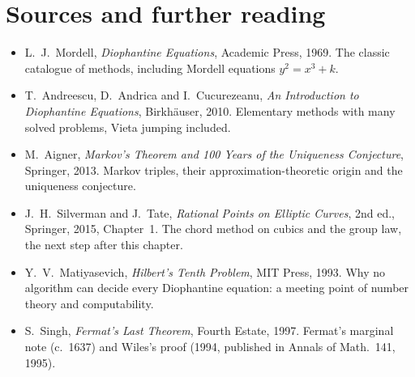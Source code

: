 \section*{Sources and further reading}

\begin{itemize}
\item L.~J.~Mordell, \emph{Diophantine Equations}, Academic Press, 1969. The classic catalogue of methods, including Mordell equations $y^2=x^3+k$.
\item T.~Andreescu, D.~Andrica and I.~Cucurezeanu, \emph{An Introduction to Diophantine Equations}, Birkh\"auser, 2010. Elementary methods with many solved problems, Vieta jumping included.
\item M.~Aigner, \emph{Markov's Theorem and 100 Years of the Uniqueness Conjecture}, Springer, 2013. Markov triples, their approximation-theoretic origin and the uniqueness conjecture.
\item J.~H.~Silverman and J.~Tate, \emph{Rational Points on Elliptic Curves}, 2nd ed., Springer, 2015, Chapter~1. The chord method on cubics and the group law, the next step after this chapter.
\item Y.~V.~Matiyasevich, \emph{Hilbert's Tenth Problem}, MIT Press, 1993. Why no algorithm can decide every Diophantine equation: a meeting point of number theory and computability.
\item S.~Singh, \emph{Fermat's Last Theorem}, Fourth Estate, 1997. Fermat's marginal note (c.~1637) and Wiles's proof (1994, published in Annals of Math.\ 141, 1995).
\end{itemize}
